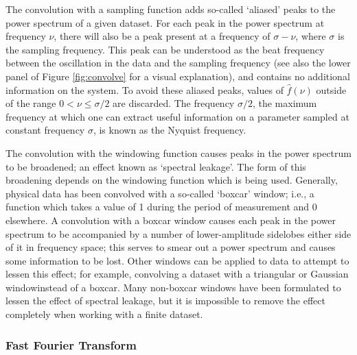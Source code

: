 \par The convolution with a sampling function adds so-called `aliased' peaks to the power spectrum of a given dataset.  For each peak in the power spectrum at frequency $\nu$, there will also be a peak present at a frequency of $\sigma-\nu$, where $\sigma$ is the sampling frequency.  This peak can be understood as the beat frequency between the oscillation in the data and the sampling frequency (see also the lower panel of Figure \ref{fig:convolve} for a visual explanation), and contains no additional information on the system.  To avoid these aliased peaks, values of $\hat{f}(\nu)$ outside of the range $0<\nu\leq\sigma/2$ are discarded.  The frequency $\sigma/2$, the maximum frequency at which one can extract useful information on a parameter sampled at constant frequency $\sigma$, is known as the Nyquist frequency.
\par The convolution with the windowing function causes peaks in the power spectrum to be broadened; an effect known as `spectral leakage'.  The form of this broadening depends on the windowing function which is being used.  Generally, physical data has been convolved with a so-called `boxcar' window; i.e., a function which takes a value of 1 during the period of measurement and 0 elsewhere.  A convolution with a boxcar window causes each peak in the power spectrum to be accompanied by a number of lower-amplitude sidelobes either side of it in frequency space; this serves to smear out a power spectrum and causes some information to be lost.  Other windows can be applied to data to attempt to lessen this effect; for example, convolving a dataset with a triangular or Gaussian windowinstead of a boxcar.  Many non-boxcar windows have been formulated to lessen the effect of spectral leakage, but it is impossible to remove the effect completely when working with a finite dataset.

\subsubsection{Fast Fourier Transform}

